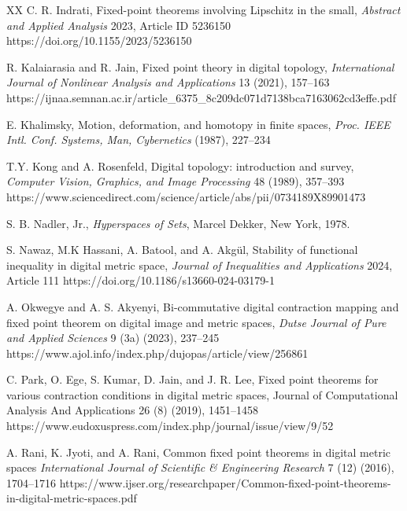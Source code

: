 \documentclass{article}
\numberwithin{thm}{section}
\begin{document}
\begin{thebibliography}{XX}
C. R. Indrati,
Fixed-point theorems involving Lipschitz in the small,
{\em Abstract and Applied Analysis} 2023, Article ID 5236150
\newline
https://doi.org/10.1155/2023/5236150

R. Kalaiarasia and R. Jain,
Fixed point theory in digital topology,
{\em International Journal of Nonlinear Analysis and Applications}
13 (2021), 157--163
\newline
https://ijnaa.semnan.ac.ir/article\_6375\_8c209dc071d7138bca7163062cd3effe.pdf

E. Khalimsky,
Motion, deformation, and homotopy in finite spaces,
{\em Proc. IEEE Intl. Conf. Systems, Man, Cybernetics}
(1987), 227--234

T.Y. Kong and A. Rosenfeld,
Digital topology: introduction and survey,
{\em Computer Vision, Graphics, and Image Processing} 48 (1989), 
357--393
\newline
https://www.sciencedirect.com/science/article/abs/pii/0734189X89901473 

S. B. Nadler, Jr., {\em 
Hyperspaces of Sets}, Marcel Dekker, New York, 1978.

S. Nawaz, M.K Hassani, A. Batool,
and A. Akg\"{u}l,
Stability of functional inequality in 
digital metric space,
{\em Journal of Inequalities and 
Applications} 2024, Article 111
\newline
https://doi.org/10.1186/s13660-024-03179-1

A. Okwegye and A. S. Akyenyi,
Bi-commutative digital contraction mapping
and fixed point theorem on digital image and metric spaces,
{\em Dutse Journal of Pure and Applied Sciences} 9 (3a) (2023),
237--245
\newline
https://www.ajol.info/index.php/dujopas/article/view/256861

C. Park, O. Ege, S. Kumar, D. Jain, and J. R. Lee,
Fixed point theorems for various contraction conditions
in digital metric spaces,
Journal of Computational Analysis And Applications 26 (8) (2019),
1451--1458
\newline
https://www.eudoxuspress.com/index.php/journal/issue/view/9/52


A. Rani, K. Jyoti, and A. Rani,
Common fixed point theorems in digital metric spaces
{\em International Journal of Scientific \& Engineering Research}
7 (12) (2016), 1704--1716
\newline
https://www.ijser.org/researchpaper/Common-fixed-point-theorems-in-digital-metric-spaces.pdf


\end{thebibliography}
\end{document}
